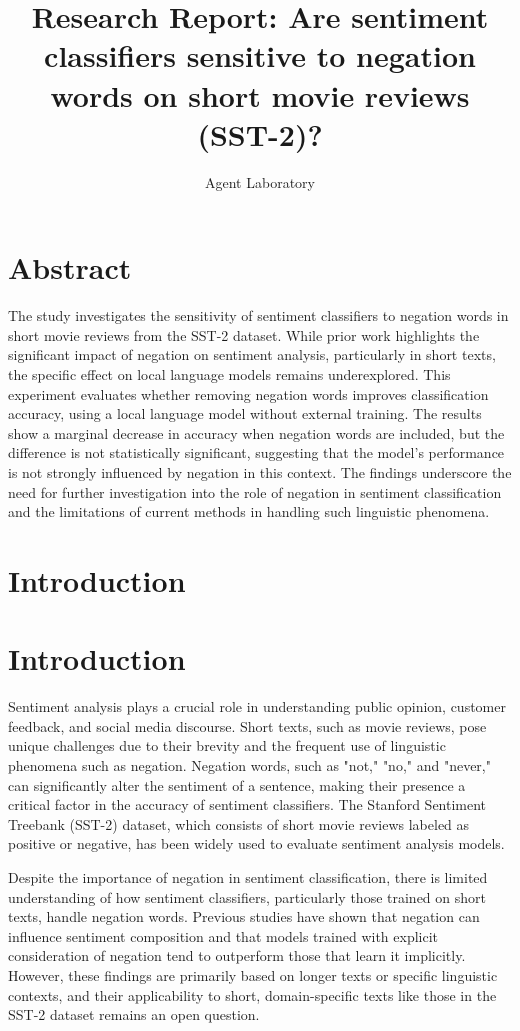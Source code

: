 \documentclass{article}
\title{Research Report: Are sentiment classifiers sensitive to negation words on short movie reviews (SST-2)?}
\author{Agent Laboratory}
\begin{document}
\maketitle
\section{Abstract}
The study investigates the sensitivity of sentiment classifiers to negation words in short movie reviews from the SST-2 dataset. While prior work highlights the significant impact of negation on sentiment analysis, particularly in short texts, the specific effect on local language models remains underexplored. This experiment evaluates whether removing negation words improves classification accuracy, using a local language model without external training. The results show a marginal decrease in accuracy when negation words are included, but the difference is not statistically significant, suggesting that the model's performance is not strongly influenced by negation in this context. The findings underscore the need for further investigation into the role of negation in sentiment classification and the limitations of current methods in handling such linguistic phenomena.
\section{Introduction}
\section{Introduction}

Sentiment analysis plays a crucial role in understanding public opinion, customer feedback, and social media discourse. Short texts, such as movie reviews, pose unique challenges due to their brevity and the frequent use of linguistic phenomena such as negation. Negation words, such as "not," "no," and "never," can significantly alter the sentiment of a sentence, making their presence a critical factor in the accuracy of sentiment classifiers. The Stanford Sentiment Treebank (SST-2) dataset, which consists of short movie reviews labeled as positive or negative, has been widely used to evaluate sentiment analysis models. 

Despite the importance of negation in sentiment classification, there is limited understanding of how sentiment classifiers, particularly those trained on short texts, handle negation words. Previous studies have shown that negation can influence sentiment composition and that models trained with explicit consideration of negation tend to outperform those that learn it implicitly. However, these findings are primarily based on longer texts or specific linguistic contexts, and their applicability to short, domain-specific texts like those in the SST-2 dataset remains an open question. 
\end{document}
